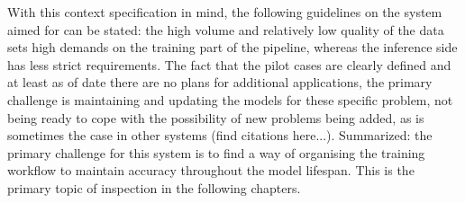 With this context specification in mind, the following guidelines on the system aimed for can be stated: the high volume and relatively low quality of the data sets high demands on the training part of the pipeline, whereas the inference side has less strict requirements. The fact that the pilot cases are clearly defined and at least as of date there are no plans for additional applications, the primary challenge is maintaining and updating the models for these specific problem, not being ready to cope with the possibility of new problems being added, as is sometimes the case in other systems (find citations here...).  Summarized: the primary challenge for this system is to find a way of organising the training workflow to maintain accuracy throughout the model lifespan. This is the primary topic of inspection in the following chapters.








%
%


